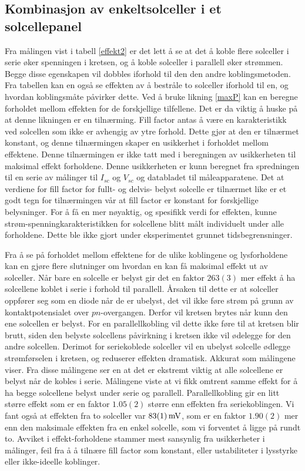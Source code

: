 \documentclass[%
 reprint,
 amsmath,amssymb,
 aps,
 norsk,
 booktabs
]{revtex4-1}
\begin{document}
\subsection{Kombinasjon av enkeltsolceller i et solcellepanel}
Fra målingen vist i tabell \vref{effekt2} er det lett å se at det å koble flere solceller i serie øker spenningen i kretsen, og å koble solceller i parallell øker strømmen. Begge disse egenskapen vil dobbles iforhold til den den andre koblingsmetoden. Fra tabellen kan en også se effekten av å bestråle to solceller iforhold til en, og hvordan koblingsmåte påvirker dette. Ved å bruke likning \eqref{maxP} kan en beregne forholdet mellom effekten for de forskjellige tilfellene. Det er da viktig å huske på at denne likningen er en tilnærming. Fill factor antas å være en karakteristikk ved solcellen som ikke er avhengig av ytre forhold. Dette gjør at den er tilnærmet konstant, og denne tilnærmingen skaper en usikkerhet i forholdet mellom effektene. Denne tilnærmingen er ikke tatt med i beregningen av usikkerheten til maksimal effekt forholdene. Denne usikkerheten er kunn beregnet fra spredningen til en serie av målinger til $I_{sc}$ og $V_{sc}$ og databladet til måleapparatene. Det at verdiene for fill factor for fullt- og delvis- belyst solcelle er tilnærmet like er et godt tegn for tilnærmingen vår at fill factor er konstant for forskjellige belysninger. For å få en mer nøyaktig, og spesifikk verdi for effekten, kunne strøm-spenningkarakteristikken for solcellene blitt målt individuelt under alle forholdene. Dette ble ikke gjort under eksperimentet grunnet tidsbegrensninger.\par
Fra å se på forholdet mellom effektene for de ulike koblingene og lysforholdene kan en gjøre flere slutninger om hvordan en kan få maksimal effekt ut av solceller. Når bare en solcelle er belyst gir det en faktor $263(3)$ mer effekt å ha solcellene koblet i serie i forhold til parallell. Årsaken til dette er at solceller oppfører seg som en diode når de er ubelyst, det vil ikke føre strøm på grunn av kontaktpotensialet over $pn$-overgangen. Derfor vil kretsen brytes når kunn den ene solcellen er belyst. For en parallellkobling vil dette ikke føre til at kretsen blir brutt, siden den belyste solcellens påvirkning i kretsen ikke vil ødelegge for den andre solcellen. Derimot for seriekoblede solceller vil en ubelyst solcelle ødlegge strømførselen i kretsen, og reduserer effekten dramatisk. Akkurat som målingene viser. Fra disse målingene ser en at det er ekstremt viktig at alle solcellene er belyst når de kobles i serie. Målingene viste at vi fikk omtrent samme effekt for å ha begge solcellene belyst under serie og parallell. Parallellkobling gir en litt større effekt som er en faktor $1.05(2)$ større enn effekten fra seriekoblingen. Vi fant også at effekten fra to solceller var $\SI{83\pm1}{\milli\volt}$, som er en faktor $1.90(2)$ mer enn den maksimale effekten fra en enkel solcelle, som vi forventet å ligge på rundt to. Avviket i effekt-forholdene stammer mest sansynlig fra usikkerheter i målinger, feil fra å å tilnære fill factor som konstant, eller ustabiliteter i lysstyrke eller ikke-ideelle koblinger.\\
\end{document}
